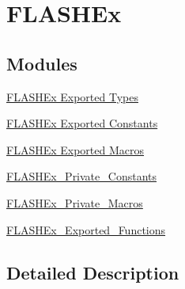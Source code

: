 \hypertarget{group___f_l_a_s_h_ex}{}\section{F\+L\+A\+S\+H\+Ex}
\label{group___f_l_a_s_h_ex}
\subsection*{Modules}
\begin{DoxyCompactItemize}
\item 
\hyperlink{group___f_l_a_s_h_ex___exported___types}{F\+L\+A\+S\+H\+Ex Exported Types}
\item 
\hyperlink{group___f_l_a_s_h_ex___exported___constants}{F\+L\+A\+S\+H\+Ex Exported Constants}
\item 
\hyperlink{group___f_l_a_s_h_ex___exported___macros}{F\+L\+A\+S\+H\+Ex Exported Macros}
\item 
\hyperlink{group___f_l_a_s_h_ex___private___constants}{F\+L\+A\+S\+H\+Ex\+\_\+\+Private\+\_\+\+Constants}
\item 
\hyperlink{group___f_l_a_s_h_ex___private___macros}{F\+L\+A\+S\+H\+Ex\+\_\+\+Private\+\_\+\+Macros}
\item 
\hyperlink{group___f_l_a_s_h_ex___exported___functions}{F\+L\+A\+S\+H\+Ex\+\_\+\+Exported\+\_\+\+Functions}
\end{DoxyCompactItemize}


\subsection{Detailed Description}
